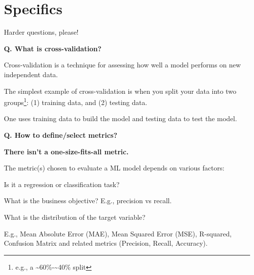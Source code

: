 \section{Specifics}
\begin{transitionframe}
  \begin{center}
    \Huge Harder questions, please!
  \end{center}
\end{transitionframe}



\begin{frame}[fragile]{\textbf{Q. What is cross-validation?}}
  \begin{wideitemize}
    \item Cross-validation is a technique for assessing how well a model
    performs on new independent data.
    \item The simplest example of cross-validation is when you split your
    data into two groups\footnote{e.g., a \~{}60\%-\~{}40\% split}:
    (1) training data, and (2) testing data.
    \item One uses training data to build the model and testing
    data to test the model.
  \end{wideitemize}
\end{frame}

\begin{frame}[fragile]{\textbf{Q. How to define/select metrics?}}
\begin{wideitemize}
  \item {\large \textbf{There isn't a one-size-fits-all metric.}}
  \item The metric(s) chosen to evaluate a ML model depends on various factors:
  \begin{wideitemize}
    \item Is it a regression or classification task?
    \item What is the business objective? E.g., precision vs recall.
    \item What is the distribution of the target variable?
  \end{wideitemize}
  \item E.g., Mean Absolute Error (MAE), Mean Squared Error (MSE), R-squared,
  Confusion Matrix and related metrics (Precision, Recall, Accuracy).
\end{wideitemize}
\end{frame}



